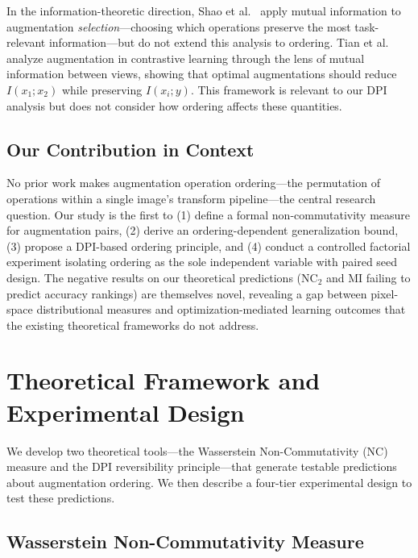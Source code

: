 \documentclass{article}
\begin{document}
In the information-theoretic direction, Shao et al.\ \cite{shao2022miaugment} apply mutual information to augmentation \emph{selection}---choosing which operations preserve the most task-relevant information---but do not extend this analysis to ordering. Tian et al.\ \cite{tian2020contrastive} analyze augmentation in contrastive learning through the lens of mutual information between views, showing that optimal augmentations should reduce $I(x_1; x_2)$ while preserving $I(x_i; y)$. This framework is relevant to our DPI analysis but does not consider how ordering affects these quantities.

\subsection{Our Contribution in Context}

No prior work makes augmentation operation ordering---the permutation of operations within a single image's transform pipeline---the central research question. Our study is the first to (1) define a formal non-commutativity measure for augmentation pairs, (2) derive an ordering-dependent generalization bound, (3) propose a DPI-based ordering principle, and (4) conduct a controlled factorial experiment isolating ordering as the sole independent variable with paired seed design. The negative results on our theoretical predictions (NC$_2$ and MI failing to predict accuracy rankings) are themselves novel, revealing a gap between pixel-space distributional measures and optimization-mediated learning outcomes that the existing theoretical frameworks do not address.

\section{Theoretical Framework and Experimental Design}
\label{sec:setup}

We develop two theoretical tools---the Wasserstein Non-Commutativity (NC) measure and the DPI reversibility principle---that generate testable predictions about augmentation ordering. We then describe a four-tier experimental design to test these predictions.

\subsection{Wasserstein Non-Commutativity Measure}
\end{document}
